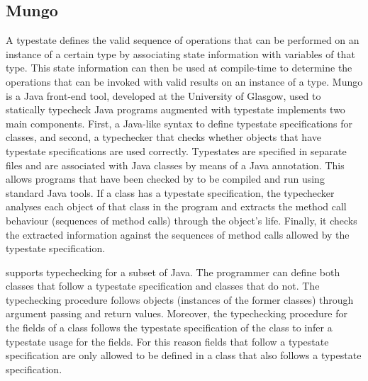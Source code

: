 \subsection{Mungo}
A typestate defines the valid sequence of operations that can be performed on an instance of a certain type by associating state information with variables of that type. This state information can then be used at compile-time to determine the operations that can be invoked with valid results on an instance of a type.
Mungo\cite{kouzapas16, dardha2017mungo} is a Java front-end tool, developed at the University of Glasgow, used to statically typecheck Java programs augmented with typestate
\Mungo implements two main components. First, a Java-like syntax to define
typestate specifications for classes, and second, a typechecker
that checks whether objects that have typestate specifications are used correctly. Typestates are specified in separate files and
are associated with Java classes by means of a Java
annotation. This allows programs that have been
checked by \Mungo to be compiled and run using standard
Java tools. If a class has a typestate specification, the \Mungo typechecker analyses each object of that class in the program and extracts the
method call behaviour (sequences of method calls) through the object's life. Finally, it checks the extracted information against
the sequences of method calls allowed by the typestate specification.

\Mungo supports typechecking for a subset of Java.
The programmer can define both classes that follow
a typestate specification and classes that do not.
The typechecking procedure follows objects (instances
of the former classes) through argument passing and
return values. Moreover, the typechecking procedure
for the fields of a class follows the typestate
specification of the class to infer a typestate
usage for the fields. For this reason fields that
follow a typestate specification are only allowed to be defined
in a class that also follows a typestate specification.
